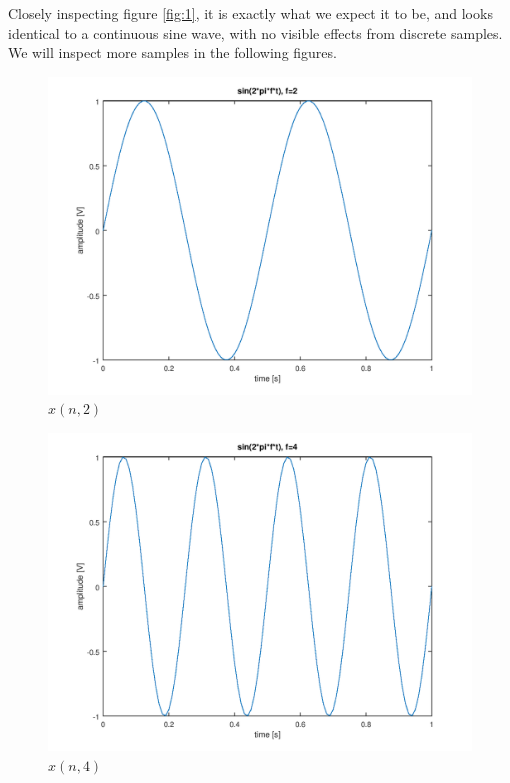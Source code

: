 \documentclass[a4paper, 12pt]{report}
\begin{document}
			Closely inspecting figure \ref{fig:1}, it is exactly what we expect it to be, and looks identical to a continuous sine wave, with no visible effects from discrete samples. We will inspect more samples in the following figures.

			\begin{figure}[H]
				\label{fig:2}
				\includegraphics[width=\textwidth]{img/1_2.png}
				\caption{$x(n, 2)$}
			\end{figure}

			\begin{figure}[H]
				\label{fig:3}
				\includegraphics[width=\textwidth]{img/1_3.png}
				\caption{$x(n, 4)$}
			\end{figure}
\end{document}
